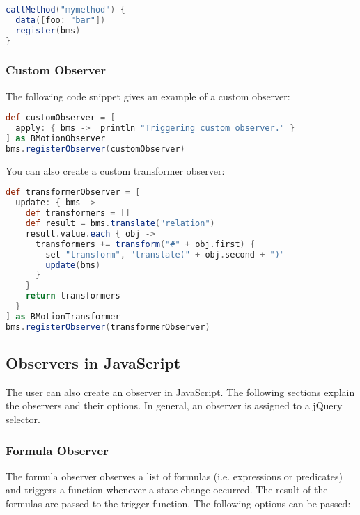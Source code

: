\begin{lstlisting}[float=ht,language=Groovy]
callMethod("mymethod") {
  data([foo: "bar"])
  register(bms)
}
\end{lstlisting}

\subsubsection{Custom Observer}
\label{sec:custom_observers}

The following code snippet gives an example of a custom observer:
\begin{lstlisting}[float=ht,language=Groovy]
def customObserver = [ 
  apply: { bms ->  println "Triggering custom observer." } 
] as BMotionObserver
bms.registerObserver(customObserver)
\end{lstlisting}

You can also create a custom transformer observer:
\begin{lstlisting}[float=ht,language=Groovy]
def transformerObserver = [
  update: { bms ->
    def transformers = []
    def result = bms.translate("relation")					
    result.value.each { obj ->
      transformers += transform("#" + obj.first) {
        set "transform", "translate(" + obj.second + ")"
        update(bms)
      }
    }
    return transformers
  }
] as BMotionTransformer
bms.registerObserver(transformerObserver)
\end{lstlisting}

\subsection{Observers in JavaScript}
\label{sec:js_observers}

The user can also create an observer in JavaScript.
The following sections explain the observers and their options.
In general, an observer is assigned to a jQuery selector.

\subsubsection{Formula Observer}

The formula observer observes a list of formulas (i.e. expressions or predicates) and triggers a function whenever a state change occurred.
The result of the formulas are passed to the trigger function.
The following options can be passed:

